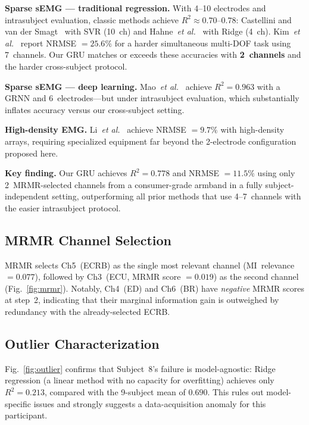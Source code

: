 \documentclass[journal]{IEEEtran}
\begin{document}
\textbf{Sparse sEMG --- traditional regression.}
With 4--10 electrodes and intrasubject evaluation, classic methods achieve
$R^2 \approx 0.70$--$0.78$: Castellini and van der
Smagt~\cite{castellini2009surface} with SVR (10~ch) and
Hahne~\emph{et al.}~\cite{hahne2014linear} with Ridge (4~ch).
Kim~\emph{et al.}~\cite{kim2020muscle} report NRMSE $= 25.6\%$ for a
harder simultaneous multi-DOF task using 7~channels.  Our GRU matches or
exceeds these accuracies with \textbf{2~channels} and the harder
cross-subject protocol.

\textbf{Sparse sEMG --- deep learning.}
Mao~\emph{et al.}~\cite{mao2023continuous} achieve $R^2 = 0.963$ with
a GRNN and 6~electrodes---but under intrasubject evaluation, which
substantially inflates accuracy versus our cross-subject setting.

\textbf{High-density EMG.}
Li~\emph{et al.}~\cite{li2024graph} achieve NRMSE $= 9.7\%$ with
high-density arrays, requiring specialized equipment far beyond the
2-electrode configuration proposed here.

\textbf{Key finding.}  Our GRU achieves $R^2 = 0.778$ and NRMSE $= 11.5\%$
using only 2~MRMR-selected channels from a consumer-grade armband in a
fully subject-independent setting, outperforming all prior methods that
use 4--7~channels with the easier intrasubject protocol.

\subsection{MRMR Channel Selection}

MRMR selects Ch5~(ECRB) as the single most relevant channel
(MI~relevance $= 0.077$), followed by Ch3~(ECU, MRMR score $= 0.019$)
as the second channel (Fig.~\ref{fig:mrmr}).  Notably, Ch4~(ED) and
Ch6~(BR) have \emph{negative} MRMR scores at step~2, indicating that
their marginal information gain is outweighed by redundancy with the
already-selected ECRB.

\subsection{Outlier Characterization}

Fig.~\ref{fig:outlier} confirms that Subject~8's failure is model-agnostic:
Ridge regression (a linear method with no capacity for overfitting)
achieves only $R^2 = 0.213$, compared with the 9-subject mean of $0.690$.
This rules out model-specific issues and strongly suggests a
data-acquisition anomaly for this participant.
\end{document}
